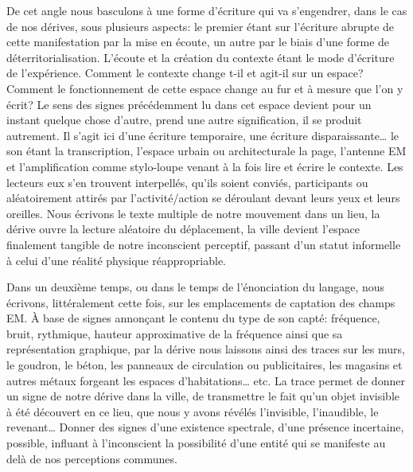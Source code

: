 {

De cet angle nous basculons \`a une forme d'\'ecriture
qui va s'engendrer, dans le cas de nos d\'erives, sous
plusieurs aspects: le premier \'etant sur l'\'ecriture
abrupte de cette manifestation par la mise en \'ecoute, un autre par le
biais d'une forme de d\'eterritorialisation.
L'\'ecoute et la cr\'eation du contexte \'etant le
mode d'\'ecriture de l'exp\'erience.
Comment le contexte change t{}-il et agit{}-il sur un espace? Comment
le fonctionnement de cette espace change au fur et \`a mesure que
l'on y \'ecrit? Le sens des signes pr\'ec\'edemment lu
dans cet espace devient pour un instant quelque chose
d'autre, prend une autre signification, il se produit
autrement. Il s'agit ici d'une
\'ecriture temporaire, une \'ecriture disparaissante{\dots} le son \'etant
la transcription, l'espace urbain ou architecturale la
page, l'antenne EM et l'amplification
comme stylo{}-loupe venant \`a la fois lire et \'ecrire le contexte.
Les lecteurs eux s'en trouvent interpell\'es,
qu'ils soient convi\'es, participants ou
al\'eatoirement attir\'es par l'activit\'e/action se
d\'eroulant devant leurs yeux et leurs oreilles. Nous \'ecrivons le
texte multiple de notre mouvement dans un lieu, la d\'erive ouvre la
lecture al\'eatoire du d\'eplacement, la ville devient
l'espace finalement tangible de notre inconscient
perceptif, passant d'un statut informelle \`a celui
d'une r\'ealit\'e physique r\'eappropriable.

Dans un deuxi\`eme temps, ou dans le temps de
l'\'enonciation du langage, nous \'ecrivons,
litt\'eralement cette fois, sur les emplacements de captation des
champs EM. \`A base de signes annon\c{c}ant le contenu du type de son
capt\'e: fr\'equence, bruit, rythmique, hauteur approximative de la
fr\'equence ainsi que sa repr\'esentation graphique, par la d\'erive
nous laissons ainsi des traces sur les murs, le goudron, le b\'eton,
les panneaux de circulation ou publicitaires, les magasins et autres
m\'etaux forgeant les espaces d'habitations{\dots} etc. La
trace permet de donner un signe de notre d\'erive dans la ville, de
transmettre le fait qu'un objet invisible \`a \'et\'e
d\'ecouvert en ce lieu, que nous y avons r\'ev\'el\'es
l'invisible, l'inaudible, le
revenant{\dots} Donner des signes d'une existence
spectrale, d'une pr\'esence incertaine, possible,
influant \`a l'inconscient la possibilit\'e
d'une entit\'e qui se manifeste au del\`a de nos
perceptions communes.

\page

}
